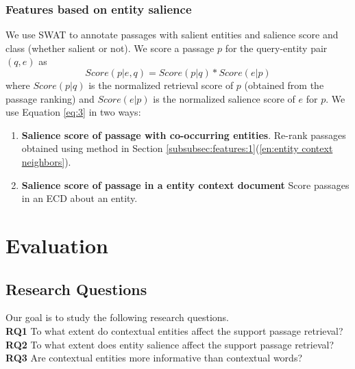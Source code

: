 \documentclass[sigconf]{acmart}
\begin{document}
\subsubsection{Features based on entity salience}
\label{subsubsec:feature:3}
We use SWAT \cite{ponza2018swat} to annotate passages with salient entities and salience score and class (whether salient or not). We score a passage $p$ for the query-entity pair $(q,e)$ as
\begin{equation}
\label{eq:3}
    Score(p | e, q) = Score(p | q) * Score(e | p)
\end{equation}
 where $Score(p | q)$ is the normalized retrieval score of $p$ (obtained from the passage ranking) and $Score(e | p)$ is the normalized salience score of $e$ for $p$. We use Equation \ref{eq:3} in two ways:
\begin{enumerate}
    \item \textbf{Salience score of passage with co-occurring entities}.
    Re-rank passages obtained using method in Section \ref{subsubsec:features:1}(\ref{en:entity context neighbors}).
    
    \item \textbf{Salience score of passage in a entity context document} Score passages in an ECD about an entity. 
\end{enumerate}
\section{Evaluation}
\label{sec:Evaluation}
\subsection{Research Questions}
\label{subsec:research questions}
Our goal is to study the following research questions.\\
\textbf{RQ1} To what extent do contextual entities affect the support passage retrieval?  \\
\textbf{RQ2} To what extent does entity salience affect the support passage retrieval?  \\
\textbf{RQ3} Are contextual entities more informative than contextual words? 
\end{document}
